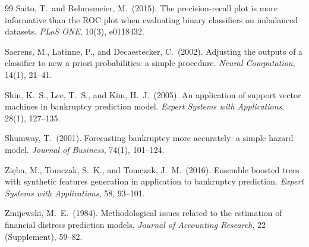 \documentclass[11pt,a4paper]{article}
\begin{document}
\begin{thebibliography}{99}
Saito, T.\ and Rehmsmeier, M.\ (2015).
\newblock The precision-recall plot is more informative than the ROC plot
when evaluating binary classifiers on imbalanced datasets.
\newblock \textit{PLoS ONE}, 10(3), e0118432.

Saerens, M., Latinne, P., and Decaestecker, C.\ (2002).
\newblock Adjusting the outputs of a classifier to new a priori probabilities:
a simple procedure.
\newblock \textit{Neural Computation}, 14(1), 21--41.

Shin, K.\ S., Lee, T.\ S., and Kim, H.\ J.\ (2005).
\newblock An application of support vector machines in bankruptcy prediction
model.
\newblock \textit{Expert Systems with Applications}, 28(1), 127--135.

Shumway, T.\ (2001).
\newblock Forecasting bankruptcy more accurately: a simple hazard model.
\newblock \textit{Journal of Business}, 74(1), 101--124.

Zięba, M., Tomczak, S.\ K., and Tomczak, J.\ M.\ (2016).
\newblock Ensemble boosted trees with synthetic features generation in
application to bankruptcy prediction.
\newblock \textit{Expert Systems with Applications}, 58, 93--101.

Zmijewski, M.\ E.\ (1984).
\newblock Methodological issues related to the estimation of financial
distress prediction models.
\newblock \textit{Journal of Accounting Research}, 22 (Supplement), 59--82.

\end{thebibliography}
\end{document}
